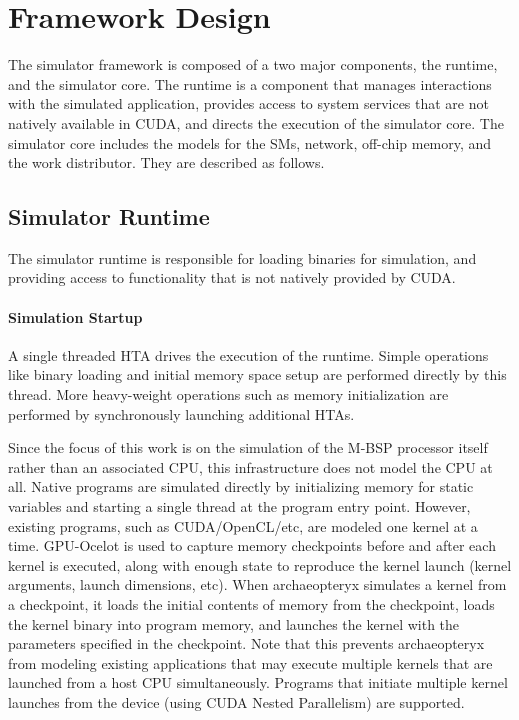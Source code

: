 \documentclass[conference, 10pt]{IEEEtran}
\begin{document}
\section{Framework Design}
\label{sec:framework-design}

The simulator framework is composed of a two major components, the runtime,
and the simulator core.  The runtime is a component that manages
interactions with the simulated application, provides access to system services
that are not natively available in CUDA, and directs the execution of the
simulator core.  The simulator core includes the models for the SMs, network, 
off-chip memory, and the work distributor.  They are described as follows.

%
%

\subsection{Simulator Runtime}

The simulator runtime is responsible for loading binaries for simulation, and
providing access to functionality that is not natively provided by CUDA.

\paragraph{Simulation Startup}
A single threaded HTA drives the execution of the runtime.
Simple operations like binary loading and initial memory space setup are
performed directly by this thread.  More heavy-weight operations such as memory
initialization are performed by synchronously launching additional HTAs.

Since the focus of this work is on the simulation of the M-BSP processor itself
rather than an associated CPU, this infrastructure does not model the CPU at
all.  Native programs are simulated directly by initializing memory for static
variables and starting a single thread at the program entry point.  However,
existing programs, such as CUDA/OpenCL/etc, are modeled one kernel at a time.  
GPU-Ocelot is used to capture memory checkpoints before and after each kernel
is executed, along with enough state to reproduce the kernel launch (kernel
arguments, launch dimensions, etc).  When archaeopteryx simulates a kernel
from a checkpoint, it loads the initial contents of memory from the checkpoint,
loads the kernel binary into program memory, and launches the kernel with
the parameters specified in the checkpoint.  Note that this prevents
archaeopteryx from modeling existing applications that may execute multiple
kernels that are launched from a host CPU simultaneously.  Programs that
initiate multiple kernel launches from the device (using CUDA Nested
Parallelism) are supported.
\end{document}
